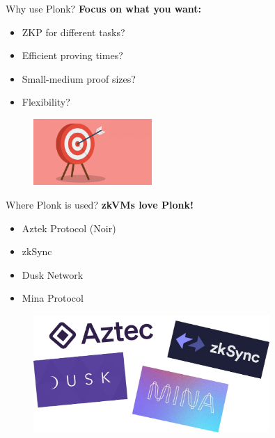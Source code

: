 \documentclass{zkdl-presentation-template}
\begin{document}
    \begin{frame}{Why use Plonk?}
        \textbf{Focus on what you want:}
        \begin{itemize}
            \item ZKP for different tasks?
            \item Efficient proving times?
            \item Small-medium proof sizes?
            \item Flexibility?
        \end{itemize}
        \begin{figure}
            \centering
            \includegraphics[width=0.4\textwidth]{images/lecture_12/goals.jpg} 
        \end{figure}
    \end{frame}

    \begin{frame}{Where Plonk is used?}
        \centering
        \textbf{zkVMs love Plonk!}
        \begin{itemize}
            \centering
            \item Aztek Protocol (Noir)
            \item zkSync
            \item Dusk Network
            \item Mina Protocol
        \end{itemize}
        \begin{figure}
            \centering
            \includegraphics[width=0.8\textwidth]{images/lecture_12/plonk-projects.jpg} 
        \end{figure}
    \end{frame}
\end{document}
